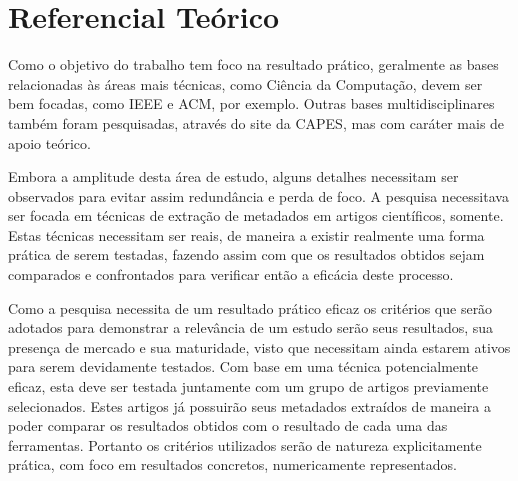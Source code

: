 
\chapter{Referencial Teórico}
\label{cha:library}






\begin{textedited}
Como o objetivo do trabalho tem foco na resultado prático, geralmente as bases relacionadas às áreas mais técnicas, como Ciência da Computação, devem ser bem focadas, como IEEE e ACM, por exemplo. Outras bases multidisciplinares também foram pesquisadas, através do site da CAPES, mas com caráter mais de apoio teórico.
\end{textedited}

Embora a amplitude desta área de estudo, alguns detalhes necessitam ser observados para evitar assim redundância e perda de foco. A pesquisa necessitava ser focada em técnicas de extração de metadados em artigos científicos, somente. Estas técnicas necessitam ser reais, de maneira a existir realmente uma forma prática de serem testadas, fazendo assim com que os resultados obtidos sejam comparados e confrontados para verificar então a eficácia deste processo.

\begin{textedited}
Como a pesquisa necessita de um resultado prático eficaz os critérios que serão adotados para demonstrar a relevância de um estudo serão seus resultados, sua presença de mercado e sua maturidade, visto que necessitam ainda estarem ativos para serem devidamente testados. Com base em uma técnica potencialmente eficaz, esta deve ser testada juntamente com um grupo de artigos previamente selecionados. Estes artigos já possuirão seus metadados extraídos de maneira a poder comparar os resultados obtidos com o resultado de cada uma das ferramentas. Portanto os critérios utilizados serão de natureza explicitamente prática, com foco em resultados concretos, numericamente representados.
\end{textedited}

